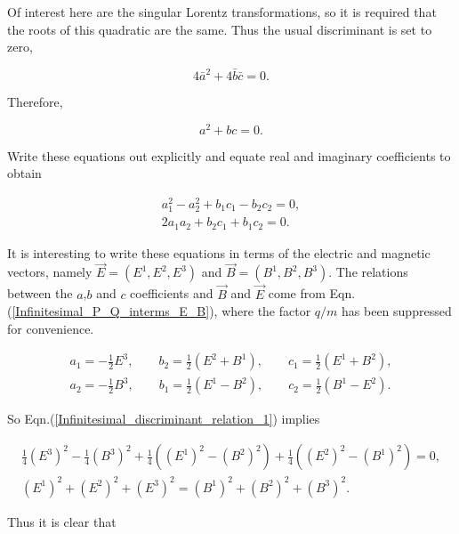 \noindent Of interest here are the singular Lorentz transformations, so it is required that the roots of this quadratic are the same. Thus the usual discriminant is set to zero,

\begin{equation*} 
4 {\bar{a}}^2 + 4 \bar{b} \bar{c} = 0.
\end{equation*} 

\noindent Therefore,

\begin{equation}\label{Infinitesimal_Fractional_Cond_on_abc}
a^2 + bc = 0.
\end{equation}

\noindent Write these equations out explicitly and equate real and imaginary coefficients to obtain

\begin{gather}\label{Infinitesimal_discriminant_relation_1}
a_1^2 - a_2^2 + b_1 c_1 - b_2 c_2 = 0, \\\label{Infinitesimal_discriminant_relation_2}
2a_1 a_2 + b_2 c_1 + b_1 c_2 = 0.
\end{gather}

It is interesting to write these equations in terms of the electric and magnetic vectors, namely $\vec{E} = (E^1, E^2, E^3)$ and $\vec{B} = (B^1,B^2,B^3)$. The relations between the $a$,$b$ and $c$ coefficients and $\vec{B}$ and $\vec{E}$ come from Eqn.(\ref{Infinitesimal_P_Q_interms_E_B}), where the factor $q/m$ has been suppressed for convenience. 

\begin{eqnarray}\label{Infinitesimal_abc_interms_EB_1}
a_1 = -\frac{1}{2} E^3, \qquad b_2 = \frac{1}{2}(E^2 + B^1), \qquad c_1 = \frac{1}{2} (E^1 + B^2), \\\label{Infinitesimal_abc_interms_EB_2}
a_2 = -\frac{1}{2} B^3, \qquad b_1 = \frac{1}{2} (E^1 - B^2), \qquad c_2  = \frac{1}{2} (B^1 - E^2). 
\end{eqnarray}

\noindent So Eqn.(\ref{Infinitesimal_discriminant_relation_1}) implies

\begin{gather*}
\frac{1}{4} {(E^3)}^2 - \frac{1}{4} {(B^3)}^2 + \frac{1}{4} ({(E^1)}^2 - {(B^2)}^2) + \frac{1}{4} ({(E^2)}^2 - {(B^1)}^2) = 0,\\
{(E^1)}^2 + {(E^2)}^2 + {(E^3)}^2 = {(B^1)}^2 + {(B^2)}^2 + {(B^3)}^2.
\end{gather*}

\noindent Thus it is clear that

